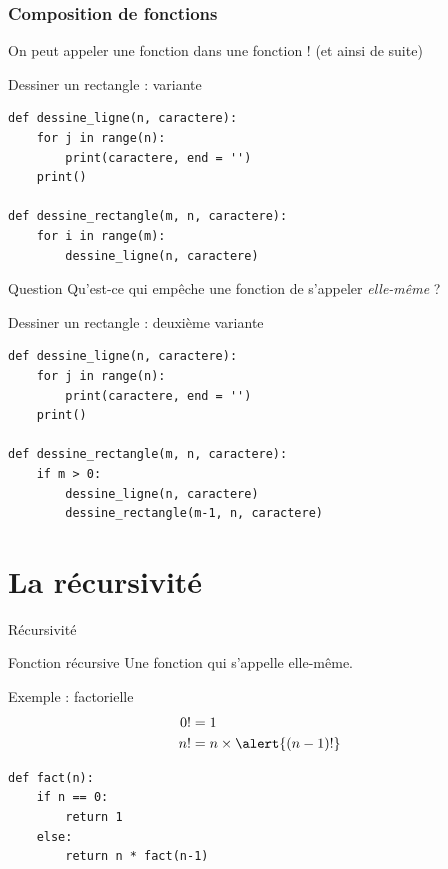 \documentclass[x11names,svgnames]{beamer}
\begin{document}
\begin{frame}[fragile]
  \frametitle{Composition de fonctions}
  
  On peut appeler une fonction dans une fonction ! (et ainsi de suite)

  \pause

  \begin{block}{Dessiner un rectangle : variante}
\begin{verbatim}
def dessine_ligne(n, caractere):
    for j in range(n):
        print(caractere, end = '')
    print()

def dessine_rectangle(m, n, caractere):
    for i in range(m):
        dessine_ligne(n, caractere)
\end{verbatim}
  \end{block}

  \pause
  \begin{alertblock}{Question}
    \vspace{0pt}
\MVRightarrow{} Qu'est-ce qui empêche une fonction de s'appeler \emph{elle-même} ?
\end{alertblock}
\end{frame}

\begin{frame}[fragile]{Dessiner un rectangle : deuxième variante}
\begin{verbatim}
def dessine_ligne(n, caractere):
    for j in range(n):
        print(caractere, end = '')
    print()

def dessine_rectangle(m, n, caractere):
    if m > 0:
        dessine_ligne(n, caractere)
        dessine_rectangle(m-1, n, caractere)
\end{verbatim}
\end{frame}

\section{La récursivité}

\begin{frame}[fragile]{Récursivité}

  \begin{block}{Fonction récursive}
    \vspace{0pt}
    \MVRightarrow{} Une fonction qui s'appelle elle-même.
  \end{block}

  \begin{block}{Exemple : factorielle}
    \begin{align*}
      0! &= 1 \\
      n! &= n \times \alert{(n-1)!}
    \end{align*}

    \pause

\begin{verbatim}
def fact(n):
    if n == 0:
        return 1
    else:
        return n * fact(n-1)
\end{verbatim}

  \end{block}

\end{frame}
\end{document}
